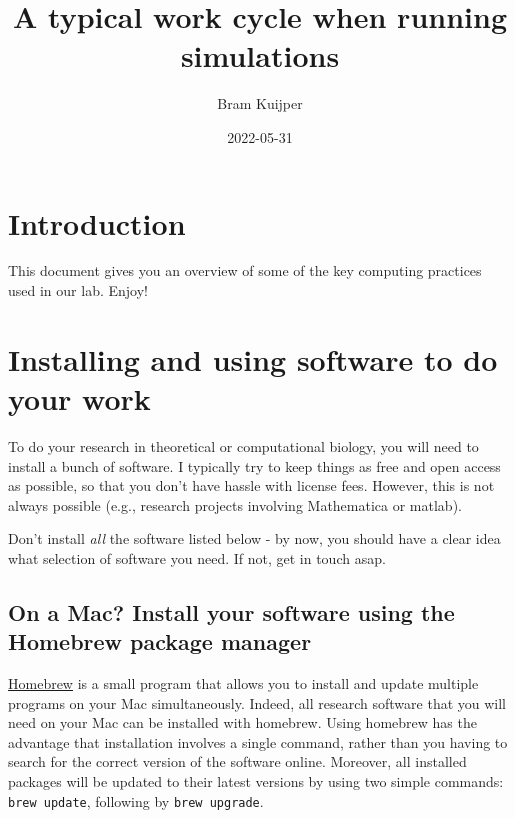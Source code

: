 \documentclass[
]{book}
\title{A typical work cycle when running simulations}
\author{Bram Kuijper}
\date{2022-05-31}
\begin{document}
\maketitle

{
\setcounter{tocdepth}{1}
\tableofcontents
}
\hypertarget{introduction}{%
\chapter{Introduction}\label{introduction}}

This document gives you an overview of some of the key computing practices used in our lab. Enjoy!

\hypertarget{installing-and-using-software-to-do-your-work}{%
\chapter{Installing and using software to do your work}\label{installing-and-using-software-to-do-your-work}}

To do your research in theoretical or computational biology, you will need to install a bunch of software. I typically try to keep things as free and open access as possible, so that you don't have hassle with license fees. However, this is not always possible (e.g., research projects involving Mathematica or matlab).

Don't install \emph{all} the software listed below - by now, you should have a clear idea what selection of software you need. If not, get in touch asap.

\hypertarget{on-a-mac-install-your-software-using-the-homebrew-package-manager}{%
\section{On a Mac? Install your software using the Homebrew package manager}\label{on-a-mac-install-your-software-using-the-homebrew-package-manager}}

\href{https://brew.sh}{Homebrew} is a small program that allows you to install and update multiple programs on your Mac simultaneously. Indeed, all research software that you will need on your Mac can be installed with homebrew. Using homebrew has the advantage that installation involves a single command, rather than you having to search for the correct version of the software online. Moreover, all installed packages will be updated to their latest versions by using two simple commands: \texttt{brew\ update}, following by \texttt{brew\ upgrade}.
\end{document}
